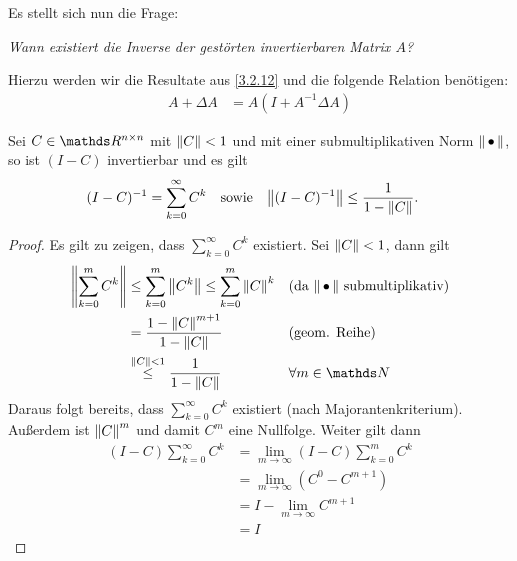 Es stellt sich nun die Frage:

\textit{Wann existiert die Inverse der gestörten invertierbaren Matrix $A$?}

Hierzu werden wir die Resultate aus \ref{3.2.12} 
und die folgende Relation benötigen:
\begin{align*}
  A+\Delta A &= A (I+A^{-1}\Delta A)
\end{align*}


\begin{Leme}
  \label{3.2.12}
  \addtocounter{equation}{1}
  Sei $C\in\Renn$ mit $\nn[C]<1$ und mit einer 
  submultiplikativen Norm $\nn$,
  so ist $(I-C)$ invertierbar und es gilt
  \begin{align*}
    (I-C)^{-1}&=\sum_{k=0}^{\infty}C^k 
    & \text{sowie} &
    &\nn[(I-C)^ {-1}] &\leq \frac{1}{1-\nn[C]}.
  \end{align*}
\end{Leme}

\begin{proof}
  Es gilt zu zeigen, dass $\sum_{k=0}^{\infty}C^k$ existiert.
  Sei $\nn[C] < 1$, dann gilt
  \begin{align*}
    \nn[ \sum_{k=0}^{m} C^k ] 
    &\leq \sum_{k=0}^{m} \nn[C^k ]  
      \leq \sum_{k=0}^{m}\nn[C]^k 
    && \text{(da $\nn$ submultiplikativ)}\\
    &= \frac{1-\nn[C]^{m+1}}{1-\nn[C]}
    &&\text{(geom. Reihe)}\\
    &\overset{\nn[C]<1}{\leq} \frac{1}{1-\nn[C]} 
    && \forall m\in \N
  \end{align*}
  Daraus folgt bereits, 
  dass $\sum_{k=0}^{\infty}C^k$ existiert (nach Majorantenkriterium).
  Außerdem ist $\nn[C]^m$ und damit $C^m$ eine Nullfolge.
  Weiter gilt dann
  \begin{align*}
    (I-C) \sum_{k=0}^{\infty}C^k 
    &= \lim_{m\to \infty}(I-C) \sum_{k=0}^{m}C^k \\
    &= \lim_{m\to \infty} (C^0-C^{m+1}) \\
    &= I - \lim_{m\to \infty} C^{m+1} \\
    &=I 
  \end{align*}
\end{proof}

